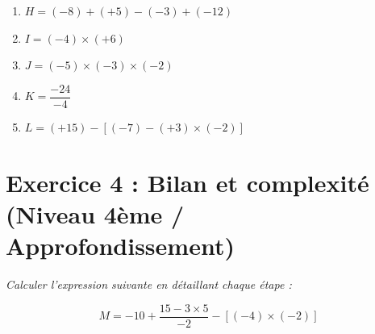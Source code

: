\documentclass[11pt,a4paper]{article}
\begin{document}
\begin{enumerate}
    \item $H = (-8) + (+5) - (-3) + (-12)$
    \item $I = (-4) \times (+6)$
    \item $J = (-5) \times (-3) \times (-2)$
    \item $K = \dfrac{-24}{-4}$
    \item $L = (+15) - [(-7) - (+3) \times (-2)]$
\end{enumerate}

\vspace{1cm}

\section*{Exercice 4 : Bilan et complexité (Niveau 4ème / Approfondissement)}
\textit{Calculer l'expression suivante en détaillant chaque étape :}

$$M = -10 + \frac{15 - 3 \times 5}{-2} - [(-4) \times (-2)]$$
\end{document}
